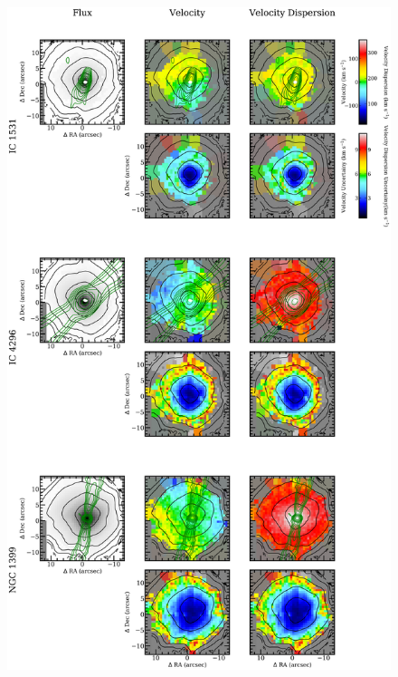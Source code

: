 		\begin{figure}
			\centering
			\includegraphics[height=0.94\textheight]{chapter4/vimos/kin2.png}
		\end{figure}

